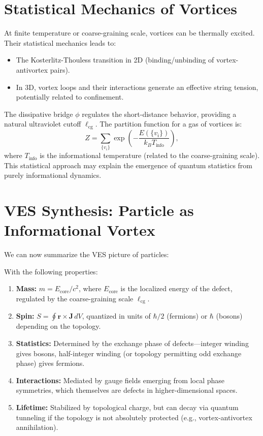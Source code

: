 \documentclass[12pt,a4paper]{book}
\begin{document}
\section{Statistical Mechanics of Vortices}

At finite temperature or coarse-graining scale, vortices can be thermally excited. Their statistical mechanics leads to:
\begin{itemize}
    \item The Kosterlitz-Thouless transition in 2D (binding/unbinding of vortex-antivortex pairs).
    \item In 3D, vortex loops and their interactions generate an effective string tension, potentially related to confinement.
\end{itemize}
The dissipative bridge $\phi$ regulates the short-distance behavior, providing a natural ultraviolet cutoff $\ell_{\text{cg}}$. The partition function for a gas of vortices is:
\begin{equation}
    Z = \sum_{\{v_i\}} \exp\left( -\frac{E(\{v_i\})}{k_B T_{\text{info}}} \right),
\end{equation}
where $T_{\text{info}}$ is the informational temperature (related to the coarse-graining scale). This statistical approach may explain the emergence of quantum statistics from purely informational dynamics.

\section{VES Synthesis: Particle as Informational Vortex}

We can now summarize the VES picture of particles:
\begin{center}
\end{center}
With the following properties:
\begin{enumerate}
    \item \textbf{Mass:} $m = E_{\text{core}}/c^2$, where $E_{\text{core}}$ is the localized energy of the defect, regulated by the coarse-graining scale $\ell_{\text{cg}}$.
    \item \textbf{Spin:} $S = \oint \mathbf{r} \times \mathbf{J} \, dV$, quantized in units of $\hbar/2$ (fermions) or $\hbar$ (bosons) depending on the topology.
    \item \textbf{Statistics:} Determined by the exchange phase of defects—integer winding gives bosons, half-integer winding (or topology permitting odd exchange phase) gives fermions.
    \item \textbf{Interactions:} Mediated by gauge fields emerging from local phase symmetries, which themselves are defects in higher-dimensional spaces.
    \item \textbf{Lifetime:} Stabilized by topological charge, but can decay via quantum tunneling if the topology is not absolutely protected (e.g., vortex-antivortex annihilation).
\end{enumerate}
\end{document}
